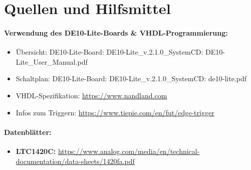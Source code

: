 \section{Quellen und Hilfsmittel}
\paragraph{Verwendung des DE10-Lite-Boards \& VHDL-Programmierung:}
\begin{itemize}
\item
Übersicht: DE10-Lite-Board: DE10-Lite\_v.2.1.0\_SystemCD: DE10-Lite\_User\_Manual.pdf
\item
\label{Schaltplan_FPGA}
Schaltplan: DE10-Lite-Board: DE10-Lite\_v.2.1.0\_SystemCD: de10-lite.pdf
\item
VHDL-Spezifikation: \url{https://www.nandland.com}
\item
Infos zum Triggern: \url{https://www.tiepie.com/en/fut/edge-trigger}
\end{itemize}
\paragraph{Datenblätter:}
\begin{itemize}
\item \label{LTC1420C_dat}
\textbf{LTC1420C:} \url{https://www.analog.com/media/en/technical-documentation/data-sheets/1420fa.pdf}
\end{itemize}
	